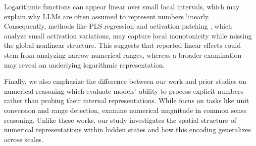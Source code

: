 
Logarithmic functions can appear linear over small local intervals, which may explain why LLMs are often assumed to represent numbers linearly. Consequently, methods like PLS regression and activation patching \cite{heinzerling2024monotonic,elshangiti2024geometrynumericalreasoninglanguage}, which analyze small activation variations, may capture local monotonicity while missing the global nonlinear structure. This suggests that reported linear effects could stem from analyzing narrow numerical ranges, whereas a broader examination may reveal an underlying logarithmic representation. 

Finally, we also emphasize the difference between our work and prior studies on numerical reasoning \cite{park2022measurements, zhang2020language} which evaluate models' ability to process explicit numbers rather than probing their internal representations. While \citet{park2022measurements} focus on tasks like unit conversion and range detection, \citet{zhang2020language} examine numerical magnitude in common sense reasoning. Unlike these works, our study investigates the spatial structure of numerical representations within hidden states and how this encoding generalizes across scales.